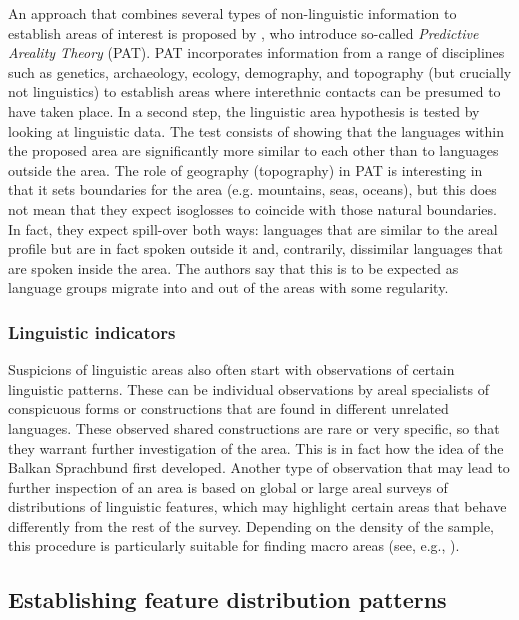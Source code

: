 \documentclass[output=paper]{langscibook}
\begin{document}
An approach that combines several types of non-linguistic information to establish areas of interest is proposed by \textcite{Bickeletal2006Oceania}, who introduce so-called \textit{Predictive Areality Theory} (PAT). PAT incorporates information from a range of disciplines such as genetics, archaeology, ecology, demography, and topography (but crucially not linguistics) to establish areas where interethnic contacts can be presumed to have taken place. In a second step, the linguistic area hypothesis is tested by looking at linguistic data. The test consists of showing that the languages within the proposed area are significantly more similar to each other than to languages outside the area. The role of geography (topography) in PAT is interesting in that it sets boundaries for the area (e.g. mountains, seas, oceans), but this does not mean that they expect isoglosses to coincide with those natural boundaries. In fact, they expect spill-over both ways: languages that are similar to the areal profile but are in fact spoken outside it and, contrarily, dissimilar languages that are spoken inside the area. The authors say that this is to be expected as language groups migrate into and out of the areas with some regularity.


\subsubsection{Linguistic indicators}
Suspicions of linguistic areas also often start with observations of certain linguistic patterns. These can be individual observations by areal specialists of conspicuous forms or constructions that are found in different unrelated languages. These observed shared constructions are rare or very specific, so that they warrant further investigation of the area. This is in fact how the idea of the Balkan Sprachbund first developed. Another type of observation that may lead to further inspection of an area is based on global or large areal surveys of distributions of linguistic features, which may highlight certain areas that behave differently from the rest of the survey. Depending on the density of the sample, this procedure is particularly suitable for finding macro areas (see, e.g., \citealt{Nichols1992Linguistic}). 


\subsection{Establishing feature distribution patterns}
\end{document}
